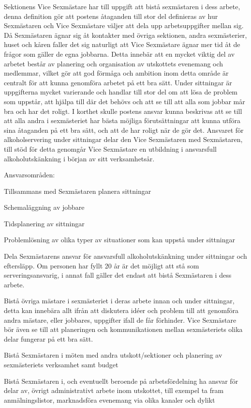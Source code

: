 \documentclass[10pt]{article}
\def\post{Vice Sexmästare}
\def\doctitle{Kravprofil för \post}
\begin{document}
\heading{\doctitle}


Sektionens {\post} har till uppgift att bistå sexmästaren i dess arbete, denna definition gör att postens åtaganden till stor del definieras av hur Sexmästaren och Vice Sexmästare väljer att dela upp arbetsuppgifter mellan sig. Då Sexmästaren ägnar sig åt kontakter med övriga sektionen, andra sexmästerier, huset och kåren faller det sig naturligt att Vice Sexmästare ägnar mer tid åt de frågor som gäller de egna jobbarna. Detta innebär att en mycket viktig del av arbetet består av planering och organisation av utskottets evenemang och medlemmar, vilket gör att god förmåga och ambition inom detta område är centralt för att kunna genomföra arbetet på ett bra sätt. Under sittningar är uppgifterna mycket varierande och handlar till stor del om att lösa de problem som uppstår, att hjälpa till där det behövs och att se till att alla som jobbar mår bra och har det roligt. I korthet skulle postens ansvar kunna beskrivas att se till att alla andra i sexmästeriet har bästa möjliga förutsättningar att kunna utföra sina åtaganden på ett bra sätt, och att de har roligt när de gör det. Ansvaret för alkoholservering under sittningar delar den Vice Sexmästaren med Sexmästaren, till stöd för detta genomgår Vice Sexmästare en utbildning i ansvarsfull alkoholutskänkning i början av sitt verksamhetsår.

Ansvarsområden:
\begin{dashlist}
    \item Tillsammans med Sexmästaren planera sittningar
    \item Schemaläggning av jobbare
    \item Tidsplanering av sittningar
    \item Problemlösning av olika typer av situationer som kan uppstå under sittningar
    \item Dela Sexmästarens ansvar för ansvarsfull alkoholutskänkning under sittningar och eftersläpp. Om personen har fyllt 20 år är det möjligt att stå som serveringsansvarig, i annat fall gäller det endast att bistå Sexmästaren i dess arbete. 
    \item Bistå övriga mästare i sexmästeriet i deras arbete innan och under sittningar, detta kan innebära allt ifrån att diskutera idéer och problem till att genomföra andra mästare, eller jobbares, uppgifter ifall de får förhinder. Vice Sexmästare bör även se till att planeringen och kommunikationen mellan sexmästeriets olika delar fungerar på ett bra sätt. 
    \item Bistå Sexmästaren i möten med andra utskott/sektioner och planering av sexmästeriets verksamhet samt budget
    \item Bistå Sexmästaren i, och eventuellt beroende på arbetsfördelning ha ansvar för delar av, övrigt administrativt arbete inom utskottet, till exempel ta fram anmälningslistor, marknadsföra evenemang via olika kanaler och dylikt
\end{dashlist}
\end{document}
